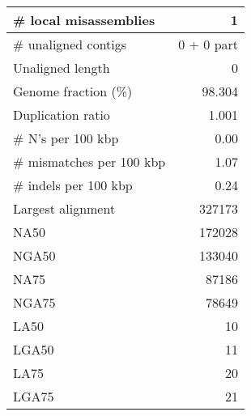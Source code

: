 \documentclass[12pt,a4paper]{article}
\begin{document}
\begin{table}[ht]
\begin{center}
\begin{tabular}{|l*{1}{|r}|}
\# local misassemblies & 1 \\ \hline
\# unaligned contigs & 0 + 0 part \\ \hline
Unaligned length & 0 \\ \hline
Genome fraction (\%) & 98.304 \\ \hline
Duplication ratio & 1.001 \\ \hline
\# N's per 100 kbp & 0.00 \\ \hline
\# mismatches per 100 kbp & 1.07 \\ \hline
\# indels per 100 kbp & 0.24 \\ \hline
Largest alignment & 327173 \\ \hline
NA50 & 172028 \\ \hline
NGA50 & 133040 \\ \hline
NA75 & 87186 \\ \hline
NGA75 & 78649 \\ \hline
LA50 & 10 \\ \hline
LGA50 & 11 \\ \hline
LA75 & 20 \\ \hline
LGA75 & 21 \\ \hline
\end{tabular}
\end{center}
\end{table}
\end{document}
